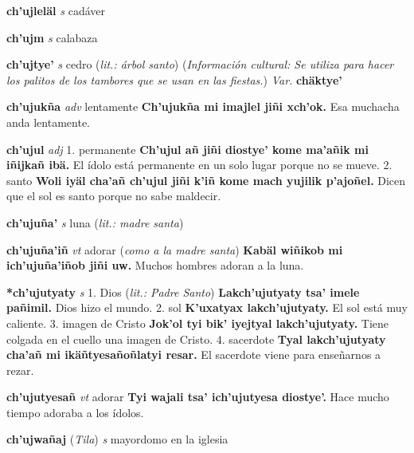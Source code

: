 \documentclass[10pt]{scrbook}
\newcommand{\entry}[1]{\textbf{#1}}
\newcommand{\onedefinition}[1]{#1.}
\newcommand{\partofspeech}[1]{\textit{#1}}
\newcommand{\spanishtranslation}[1]{#1}
\newcommand{\clarification}[1]{(\textit{#1})}
\newcommand{\cholexample}[1]{\textbf{#1}}
\newcommand{\exampletranslation}[1]{#1}
\newcommand{\relevantdialect}[1]{(\textit{#1})}
\newcommand{\culturalinformation}[1]{(\textit{#1})}
\newcommand{\variation}[1]{\textit{Var.} \textbf{#1}}
\begin{document}
\begin{multicols}{2}
\entry{ch'ujleläl}
\partofspeech{s}
\spanishtranslation{cadáver}

\entry{ch'ujm}
\partofspeech{s}
\spanishtranslation{calabaza}

\entry{ch'ujtye'}
\partofspeech{s}
\spanishtranslation{cedro}
\clarification{lit.: árbol santo}
\culturalinformation{Información cultural: Se utiliza para hacer los palitos de los tambores que se usan en las fiestas.}
\variation{chäktye'}

\entry{ch'ujukña}
\partofspeech{adv}
\spanishtranslation{lentamente}
\cholexample{Ch'ujukña mi imajlel jiñi xch'ok.}
\exampletranslation{Esa muchacha anda lentamente.}

\entry{ch'ujul}
\partofspeech{adj}
\onedefinition{1}
\spanishtranslation{permanente}
\cholexample{Ch'ujul añ jiñi diostye' kome ma'añik mi iñijkañ ibä.}
\exampletranslation{El ídolo está permanente en un solo lugar porque no se mueve.}
\onedefinition{2}
\spanishtranslation{santo}
\cholexample{Woli iyäl cha'añ ch'ujul jiñi k'iñ kome mach yujilik p'ajoñel.}
\exampletranslation{Dicen que el sol es santo porque no sabe maldecir.}

\entry{ch'ujuña'}
\partofspeech{s}
\spanishtranslation{luna}
\clarification{lit.: madre santa}

\entry{ch'ujuña'iñ}
\partofspeech{vt}
\spanishtranslation{adorar}
\clarification{como a la madre santa}
\cholexample{Kabäl wiñikob mi ich'ujuña'iñob jiñi uw.}
\exampletranslation{Muchos hombres adoran a la luna.}

\entry{*ch'ujutyaty}
\partofspeech{s}
\onedefinition{1}
\spanishtranslation{Dios}
\clarification{lit.: Padre Santo}
\cholexample{Lakch'ujutyaty tsa' imele pañimil.}
\exampletranslation{Dios hizo el mundo.}
\onedefinition{2}
\spanishtranslation{sol}
\cholexample{K'uxatyax lakch'ujutyaty.}
\exampletranslation{El sol está muy caliente.}
\onedefinition{3}
\spanishtranslation{imagen de Cristo}
\cholexample{Jok'ol tyi bik' iyejtyal lakch'ujutyaty.}
\exampletranslation{Tiene colgada en el cuello una imagen de Cristo.}
\onedefinition{4}
\spanishtranslation{sacerdote}
\cholexample{Tyal lakch'ujutyaty cha'añ mi ikäñtyesañoñlatyi resar.}
\exampletranslation{El sacerdote viene para enseñarnos a rezar.}

\entry{ch'ujutyesañ}
\partofspeech{vt}
\spanishtranslation{adorar}
\cholexample{Tyi wajali tsa' ich'ujutyesa diostye'.}
\exampletranslation{Hace mucho tiempo adoraba a los ídolos.}

\entry{ch'ujwañaj}
\relevantdialect{Tila}
\partofspeech{s}
\spanishtranslation{mayordomo en la iglesia}


\end{multicols}
\end{document}
